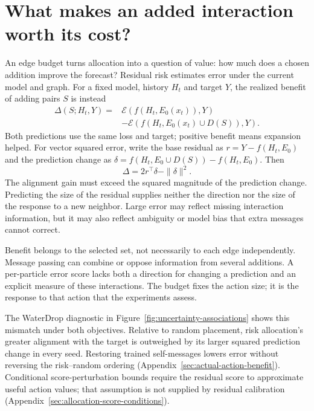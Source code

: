 \section{What makes an added interaction worth its cost?}
An edge budget turns allocation into a question of value: how much does a chosen addition improve the forecast? Residual risk estimates error under the current model and graph. For a fixed model, history $H_t$ and target $Y$, the realized benefit of adding pairs $S$ is instead
\begin{align}
 \Delta(S;H_t,Y)={}&\mathcal E(f(H_t,E_0(x_t)),Y)\nonumber\\
 &-\mathcal E(f(H_t,E_0(x_t)\cup D(S)),Y).
 \label{eq:intervention-benefit}
\end{align}
Both predictions use the same loss and target; positive benefit means expansion helped. For vector squared error, write the base residual as $r=Y-f(H_t,E_0)$ and the prediction change as $\delta=f(H_t,E_0\cup D(S))-f(H_t,E_0)$. Then
\begin{equation}
 \Delta=2r^\top\delta-\|\delta\|^2.
 \label{eq:benefit-alignment}
\end{equation}
The alignment gain must exceed the squared magnitude of the prediction change. Predicting the size of the residual supplies neither the direction nor the size of the response to a new neighbor. Large error may reflect missing interaction information, but it may also reflect ambiguity or model bias that extra messages cannot correct.

Benefit belongs to the selected set, not necessarily to each edge independently. Message passing can combine or oppose information from several additions. A per-particle error score lacks both a direction for changing a prediction and an explicit measure of these interactions. The budget fixes the action size; it is the response to that action that the experiments assess.

The WaterDrop diagnostic in Figure~\ref{fig:uncertainty-associations} shows this mismatch under both objectives. Relative to random placement, risk allocation's greater alignment with the target is outweighed by its larger squared prediction change in every seed. Restoring trained self-messages lowers error without reversing the risk--random ordering (Appendix~\ref{sec:actual-action-benefit}). Conditional score-perturbation bounds require the residual score to approximate useful action values; that assumption is not supplied by residual calibration (Appendix~\ref{sec:allocation-score-conditions}).

